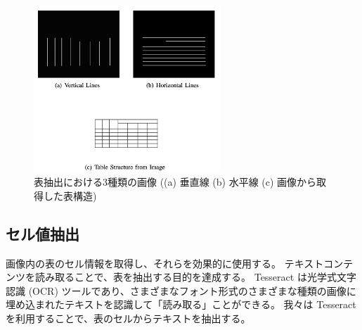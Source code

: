 \documentclass[uplatex, twocolumn,10pt]{jsarticle}
\begin{document}
\begin{figure}[tp]
    \begin{center}
        \includegraphics*[width=7cm]{image/master/master2/Fig3.png}
        \caption{表抽出における3種類の画像 ((a) 垂直線 (b) 水平線 (c) 画像から取得した表構造)}
        \label{fig3}
    \end{center}
\end{figure}


\subsection{セル値抽出}
画像内の表のセル情報を取得し、それらを効果的に使用する。
テキストコンテンツを読み取ることで、表を抽出する目的を達成する。
Tesseract は光学式文字認識 (OCR) ツールであり、さまざまなフォント形式のさまざまな種類の画像に埋め込まれたテキストを認識して「読み取る」ことができる\cite{bib25}。
我々は Tesseract を利用することで、表のセルからテキストを抽出する。
\end{document}

